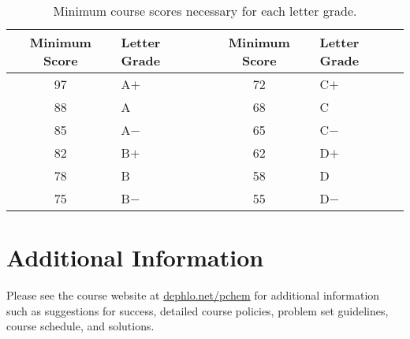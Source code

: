 \documentclass[letterpaper,oneside,onecolumn,11pt,article]{memoir}
\begin{document}
\begin{table}[h]
\caption{\sffamily Minimum course scores necessary for each letter grade.}
\label{tab:lettergrades}
\begin{tabular}{cl||cl} \toprule
\textbf{Minimum Score} & \textbf{Letter Grade} & \textbf{Minimum Score} & \textbf{Letter Grade} \\ \hline
97 & \hspace{0.3in}A$+$ & 72 & \hspace{0.3in}C$+$ \\
88 & \hspace{0.3in}A & 68 & \hspace{0.3in}C \\
85 & \hspace{0.3in}A$-$ & 65 & \hspace{0.3in}C$-$ \\
82 & \hspace{0.3in}B$+$ & 62 & \hspace{0.3in}D$+$ \\
78 & \hspace{0.3in}B & 58 & \hspace{0.3in}D \\
75 & \hspace{0.3in}B$-$ & 55 & \hspace{0.3in}D$-$ \\
\bottomrule
\end{tabular}
\end{table}

\section{Additional Information}

Please see the course website at \href{http://dephlo.net/pchem}{dephlo.net/pchem} for additional information such as suggestions for success, detailed course policies, problem set guidelines, course schedule, and solutions. 
\end{document}
